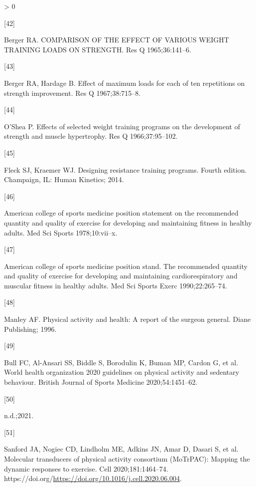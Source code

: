 \documentclass[twoside,10pt]{gihclass} %
\newlength{\cslhangindent}
\newlength{\csllabelwidth}
\newenvironment{CSLReferences}[3] %
 {%
  \setlength{\parindent}{0pt}
  \ifodd #1 \everypar{\setlength{\hangindent}{\cslhangindent}}\ignorespaces\fi
  \ifnum #2 > 0
  \setlength{\parskip}{#2\baselineskip}
  \fi
 }%
 {}
\newcommand{\CSLLeftMargin}[1]{\parbox[t]{\maxof{\widthof{#1}}{\csllabelwidth}}{#1}}
\newcommand{\CSLRightInline}[1]{\parbox[t]{\linewidth}{#1}}
\begin{document}
\begin{CSLReferences}{0}{0}
\leavevmode\hypertarget{ref-RN2659}{}%
\CSLLeftMargin{{[}42{]} }
\CSLRightInline{Berger RA. COMPARISON OF THE EFFECT OF VARIOUS WEIGHT TRAINING LOADS ON STRENGTH. Res Q 1965;36:141--6.}

\leavevmode\hypertarget{ref-RN2658}{}%
\CSLLeftMargin{{[}43{]} }
\CSLRightInline{Berger RA, Hardage B. Effect of maximum loads for each of ten repetitions on strength improvement. Res Q 1967;38:715--8.}

\leavevmode\hypertarget{ref-RN2656}{}%
\CSLLeftMargin{{[}44{]} }
\CSLRightInline{O'Shea P. Effects of selected weight training programs on the development of strength and muscle hypertrophy. Res Q 1966;37:95--102.}

\leavevmode\hypertarget{ref-RN2537}{}%
\CSLLeftMargin{{[}45{]} }
\CSLRightInline{Fleck SJ, Kraemer WJ. Designing resistance training programs. Fourth edition. Champaign, IL: Human Kinetics; 2014.}

\leavevmode\hypertarget{ref-RN2655}{}%
\CSLLeftMargin{{[}46{]} }
\CSLRightInline{American college of sports medicine position statement on the recommended quantity and quality of exercise for developing and maintaining fitness in healthy adults. Med Sci Sports 1978;10:vii--x.}

\leavevmode\hypertarget{ref-RN2654}{}%
\CSLLeftMargin{{[}47{]} }
\CSLRightInline{American college of sports medicine position stand. The recommended quantity and quality of exercise for developing and maintaining cardiorespiratory and muscular fitness in healthy adults. Med Sci Sports Exerc 1990;22:265--74.}

\leavevmode\hypertarget{ref-RN2666}{}%
\CSLLeftMargin{{[}48{]} }
\CSLRightInline{Manley AF. Physical activity and health: A report of the surgeon general. Diane Publishing; 1996.}

\leavevmode\hypertarget{ref-RN2667}{}%
\CSLLeftMargin{{[}49{]} }
\CSLRightInline{Bull FC, Al-Ansari SS, Biddle S, Borodulin K, Buman MP, Cardon G, et al. World health organization 2020 guidelines on physical activity and sedentary behaviour. British Journal of Sports Medicine 2020;54:1451--62.}

\leavevmode\hypertarget{ref-RN2696}{}%
\CSLLeftMargin{{[}50{]} }
\CSLRightInline{n.d.;2021.}

\leavevmode\hypertarget{ref-RN2678}{}%
\CSLLeftMargin{{[}51{]} }
\CSLRightInline{Sanford JA, Nogiec CD, Lindholm ME, Adkins JN, Amar D, Dasari S, et al. Molecular transducers of physical activity consortium (MoTrPAC): Mapping the dynamic responses to exercise. Cell 2020;181:1464--74. https://doi.org/\url{https://doi.org/10.1016/j.cell.2020.06.004}.}


\end{CSLReferences}
\end{document}
